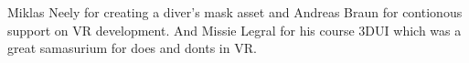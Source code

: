 \documentclass[letterpaper, 10 pt, conference]{ieeeconf}  %
\begin{document}
Miklas Neely for creating a diver's mask asset and Andreas Braun for contionous support on VR development.
And Missie Legral for his course 3DUI which was a great samasurium for does and donts in VR.









\printbibliography[
title={References},
notkeyword=game
]

\printbibliography[
title={Ludography},
keyword=game
]

\end{document}
